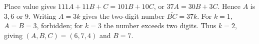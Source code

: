 Place value gives $111A+11B+C=101B+10C$, or $37A=30B+3C$. Hence $A$ is $3,6$ or $9$. Writing $A=3k$ gives the two-digit number $\overline{BC}=37k$. For $k=1$, $A=B=3$, forbidden; for $k=3$ the number exceeds two digits. Thus $k=2$, giving $(A,B,C)=(6,7,4)$ and $\boxed{B=7}$.

